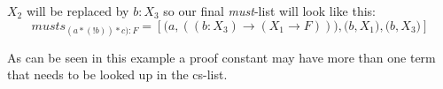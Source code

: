 $X_2$ will be replaced by $b:X_3$ so our final \emph{must}-list will look like this: 
\begin{equation}\label{must-list}
musts_{(a*(!b))*c):F} = [ \bigl( a, ((b:X_3) \rightarrow (X_1 \rightarrow F)) \bigr) , \bigl( b, X_1 \bigr) , \bigl( b, X_3 \bigr) ] 
\end{equation}

As can be seen in this example a proof constant may have more than one term that needs to be looked up in the cs-list.